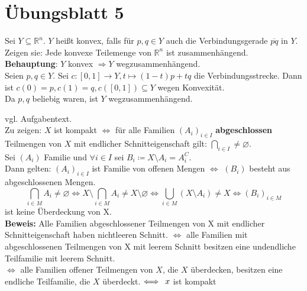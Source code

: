 % 
\section{Übungsblatt 5}

\begin{problem*}[1a]
  
  Sei \( Y \subseteq \mathbb{R}^n \). \( Y \) heißt konvex, falls für \( p, q \in Y \) auch die Verbindungsgerade \( \overline{pq} \) in \( Y \). \\
  Zeigen sie: Jede konvexe Teilemenge von \( \mathbb{R}^n \) ist zusammenhängend. \\
  \textbf{Behauptung}: \( Y \) konvex \( \Rightarrow Y \) wegzusammenhängend. \\
  Seien \( p, q \in Y \). Sei \( c: [0,1] \to Y, t \mapsto (1-t)p +tq \) die Verbindungsstrecke.
  Dann ist \( c(0) = p, c(1) = q, c([0,1]) \subseteq Y \) wegen Konvexität. \\
  Da \( p,q \) beliebig waren, ist \( Y \) wegzusammenhängend. 
\end{problem*}

\begin{problem*}[2]	
  vgl. Aufgabentext. \\
  Zu zeigen: \( X \) ist kompakt \( \Longleftrightarrow \) für alle Familien \( {(A_i)}_{i \in I} \) \textbf{abgeschlossen}
  Teilmengen von \( X \) mit endlicher Schnitteigenschaft gilt: \( \bigcap_{i \in I} \neq \varnothing \). \\
  Sei \( (A_i) \) Familie und \( \forall i \in I \) sei \( B_i \coloneqq X \setminus A_i = A_i^{C} \). \\
  Dann gelten: 
  \( {(A_i)}_ { i \in I} \) ist Familie von offenen Mengen \( \Longleftrightarrow \) \( (B_i) \) besteht aus abgeschlossenen Mengen.
	\begin{equation*}
		\bigcap_{i \in M} A_i \neq \varnothing \Leftrightarrow X \setminus \bigcap_{i \in M} A_i \neq	X \setminus \varnothing \Leftrightarrow \bigcup_ {i \in M} (X \setminus A_i) \neq X \Longleftrightarrow {(B_i)}_{i \in M} 
	\end{equation*}
	ist keine Überdeckung von X. \\
	\textbf{Beweis:} Alle Familien abgeschlossener Teilmengen von X mit endlicher Schnitteigenschaft haben nichtleeren Schnitt. \( \Leftrightarrow \) alle Familien mit abgeschlossenen Teilmengen von X mit leerem Schnitt besitzen eine undendliche Teilfamilie mit leerem Schnitt. \\
  \( \Leftrightarrow \) alle Familien offener Teilmengen von \( X \), die \( X \) überdecken, besitzen eine endliche Teilfamilie, die \( X \) überdeckt. \( \Longleftrightarrow \enskip x \) ist kompakt
\end{problem*}

